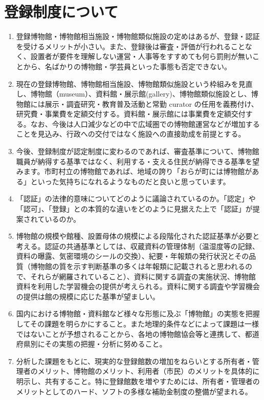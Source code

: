 \documentclass[12pt]{jsarticle}
\begin{document}
\section{登録制度について}
\begin{enumerate}
	\item 登録博物館・博物館相当施設・博物館類似施設の定めはあるが、登録・認証を受けるメリットが小さい。また、登録後は審査・評価が行われることなく、設置者が要件を理解しない運営・人事等をすすめても何ら罰則が無いことから、名ばかりの博物館・学芸員といった事態も否定できない。
	\item 現在の登録博物館、博物館相当施設、博物館類似施設という枠組みを見直し、博物館（museum）、資料館・展示館(gallery)、博物館類似施設とし、博物館には展示・調査研究・教育普及活動と常勤 curator の任用を義務付け、研究費・事業費を定額交付する。資料館・展示館には事業費を定額交付する。なお、今後は人口減少などの中で広域圏での博物館運営などが増加することを見込み、行政への交付ではなく施設への直接助成を前提とする。
	\item 今後、登録制度が認定制度に変わるのであれば、審査基準について、博物館職員が納得する基準ではなく、利用する・支える住民が納得できる基準を望みます。市町村立の博物館であれば、地域の誇り「おらが町には博物館がある」といった気持ちになれるようなものだと良いと思っています。
	\item 「認証」の法律的意味についてどのように議論されているのか。「認定」や「認可」、「登録」との本質的な違いをどのように見据えた上で「認証」が提案されているのか。
	\item 博物館の規模や館種、設置母体の規模による段階化された認証基準が必要と考える。認証の共通基準としては、収蔵資料の管理体制（温湿度等の記録、資料の曝露、気密環境のシールの交換）、紀要・年報類の発行状況とその品質（博物館の質を示す判断基準の多くは年報類に記載されると思われるので、それらが網羅されていること）、資料に関する調査の実施状況、博物館資料を利用した学習機会の提供が考えられる。資料に関する調査や学習機会の提供は館の規模に応じた基準が望ましい。
	\item 国内における博物館・資料館など様々な形態に及ぶ「博物館」の実態を把握してその課題を明らかにすること。また地理的条件などによって課題は一様ではないことが予想されることから、各地の博物館協会等と連携して、都道府県別にその実態の把握・分析に努めること。
	\item 分析した課題をもとに、現実的な登録館数の増加をねらいとする所有者・管理者のメリット、博物館のメリット、利用者（市民）のメリットを具体的に明示し、共有すること。特に登録館数を増やすためには、所有者・管理者のメリットとしてのハード、ソフトの多様な補助金制度の整備が望まれる。

\end{enumerate}
\end{document}
